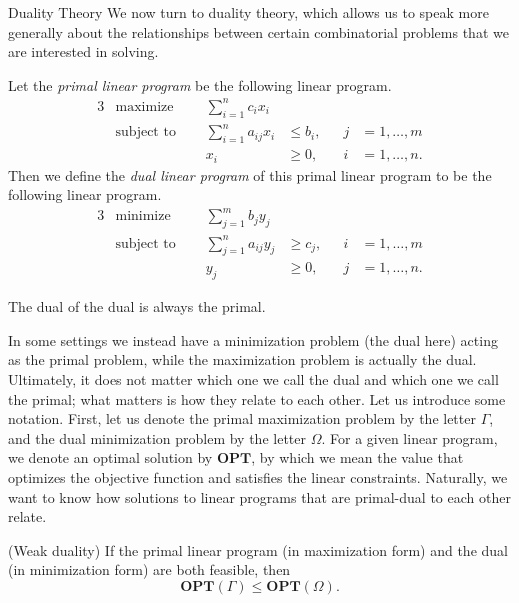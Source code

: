 \begin{section}{Duality Theory}
	We now turn to duality theory, which allows us to speak more generally about the relationships 
	between certain combinatorial problems that we are interested in solving.
	\begin{definition}
		Let the \emph{primal linear program} be the following linear program.
		\begin{alignat}{3}
			& \text{maximize } & \sum_{i=1}^{n} c_{i} x_{i}& \\
			& \text{subject to } \quad & \sum_{i=1}^{n} a_{ij} x_{i} & \leq b_{i}, & j & 
			= 1, \dots , m \\
					&& x_{i} & \geq 0, \quad & i & = 1, \dots, n.
		\end{alignat}		
		Then we define the \emph{dual linear program} of this primal linear program to be the 
		following linear program.
		\begin{alignat}{3}
			& \text{minimize } & \sum_{j=1}^{m} b_{j} y_{j}& \\
			& \text{subject to } \quad & \sum_{j=1}^{n} a_{ij} y_{j} & \geq c_{j}, & i & 
			= 1, \dots , m \\
					&& y_{j} & \geq 0, \quad & j & = 1, \dots, n.
		\end{alignat}		

		The dual of the dual is always the primal.
	\end{definition}
	In some settings we instead 
	have a minimization problem (the dual here) acting as the primal problem, while the maximization 
	problem is actually the dual. Ultimately, it does not matter which one we call the dual and
	which one we call the primal; what matters is how they relate to each other. 
	Let us introduce some 
	notation. First, let us denote the primal maximization problem by the letter $\Gamma$, and 
	the dual minimization problem by the letter $\Omega$. For a given linear program, we denote 
	an optimal solution by $\mathbf{OPT}$, by which we mean the value that optimizes the objective 
	function and satisfies the linear constraints. Naturally, we want to know how solutions to 
	linear programs that are primal-dual to each other relate.

	\begin{theorem}{(Weak duality)}
		If the primal linear program (in maximization form) and the dual (in minimization 
		form) are both feasible, then 
		\[
			\mathbf{OPT}(\Gamma) \leq \mathbf{OPT}(\Omega).
		\]
	\end{theorem}


\end{section}
